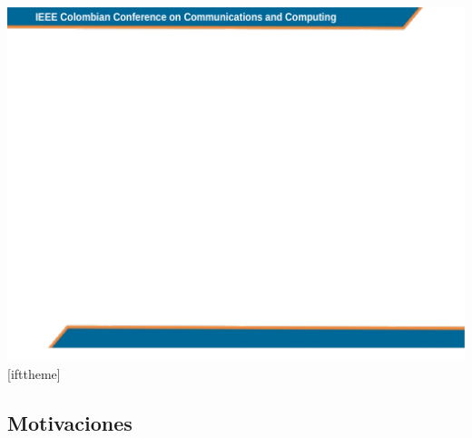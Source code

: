 %
%
 {\includegraphics[width=\paperwidth,height=\paperheight]{fondo}}
[ifttheme]





\subsection{Motivaciones}

